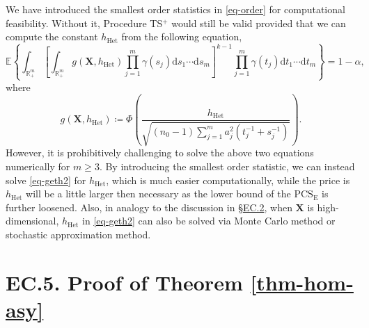 \documentclass[ijoc,nonblindrev]{informs3}
\def\E{\mathbb{E}}
\def\ud{\mathrm{d}}
\def\bX{{\bm X}}
\def\PCSE{\mathrm{PCS}_{\mathrm{E}}}
\def\hhet{h_{\mathrm{Het}}}
\begin{document}
\begin{remark}  \label{remark:h}
We have introduced the smallest order statistics in \eqref{eq-order} for computational feasibility.
Without it, Procedure TS$^+$ would still be valid provided that we can compute the constant $\hhet$ from the following equation,
\begin{equation*}\label{eq-geth3}
\E \left\{ \int_{\mathbb{R}_+^m} \left[  \int_{\mathbb{R}_+^m} g(\bX,\hhet)  \prod_{j=1}^m\gamma(s_j)\ud s_1\cdots \ud s_m\right]^{k-1} \prod_{j=1}^m \gamma(t_j)  \ud t_1 \cdots \ud t_m \right\} = 1-\alpha,
\end{equation*}
where
\[g(\bX,\hhet) \coloneqq \Phi \left( \frac{\hhet}{\sqrt{ (n_0-1) \sum_{j=1}^m a_j^2(t_j^{-1} +s_j^{-1}) }} \right).\]
However, it is prohibitively challenging to solve the above two equations numerically for $m\geq 3$.
By introducing the smallest order statistic, we can instead solve \eqref{eq-geth2} for $\hhet$, which is much easier computationally,
while the price is $\hhet$ will be a little larger then necessary as the lower bound of the $\PCSE$ is further loosened.
Also, in analogy to the discussion in \S\hyperlink{EC.2}{EC.2}, when $\bX$ is high-dimensional, $\hhet$ in \eqref{eq-geth2} can also be solved via Monte Carlo method or stochastic approximation method.
\end{remark}



\hypertarget{EC.5}{
\section*{EC.5. \hspace{5pt} Proof of Theorem \ref{thm-hom-asy}}
}
\end{document}
